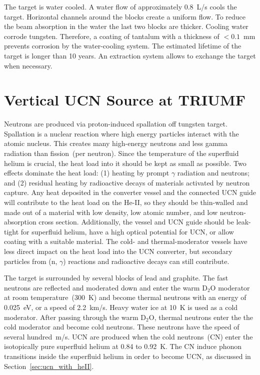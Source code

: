 The target is water cooled. A water flow of approximately
0.8~L/s cools the target. Horizontal channels around the blocks create
a uniform flow. To reduce the beam absorption in the water the last
two blocks are thicker. Cooling water corrode tungsten.  Therefore, a
coating of tantalum with a thickness of $< 0.1$~mm prevents corrosion
by the water-cooling system. The estimated lifetime of the target is
longer than 10 years. An extraction system allows to exchange the
target when necessary.


\section{Vertical UCN Source at TRIUMF\label{sec:vertical_source}}
Neutrons are produced via proton-induced spallation off tungsten
target. Spallation is a nuclear reaction where high energy particles
interact with the atomic nucleus. This creates many high-energy
neutrons and less gamma radiation than fission~(per neutron). Since
the temperature of the superfluid helium is crucial, the heat load
into it should be kept as small as possible. Two effects dominate the
heat load: (1) heating by prompt $\gamma$ radiation and neutrons; and
(2) residual heating by radioactive decays of materials activated by
neutron capture.  Any heat deposited in the converter vessel and the
connected UCN guide will contribute to the heat load on the He-II, so
they should be thin-walled and made out of a material with low
density, low atomic number, and low neutron-absorption cross
section. Additionally, the vessel and UCN guide should be leak-tight
for superfluid helium, have a high optical potential for UCN, or allow
coating with a suitable material. The cold- and thermal-moderator
vessels have less direct impact on the heat load into the UCN
converter, but secondary particles from (n, $\gamma$) reactions and
radioactive decays can still contribute.




The target is surrounded by several blocks of lead and graphite. The
fast neutrons are reflected and moderated down and enter the warm
D$_2$O moderator at room temperature~(300~K) and become thermal
neutrons with an energy of 0.025~eV, or a speed of 2.2~km/s.  Heavy
water ice at 10~K is used as a cold moderator. After passing through
the warm D$_2$O, thermal neutrons enter the the cold moderator and
become cold neutrons. These neutrons have the speed of several
hundred~m/s. UCN are produced when the cold neutrons~(CN) enter the
isotopically pure superfluid helium at 0.84 to 0.92~K. The CN induce
phonon transitions inside the superfluid helium in order to become
UCN, as discussed in Section~\ref{sec:ucn_with_heII}.




